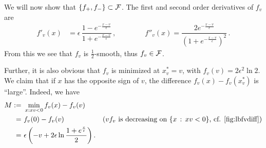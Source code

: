 We will now show that $\{f_+, f_-\}\subset \mathcal{F}$.
The first and second order derivatives of $f_v$ are
\begin{align*}
f'_v(x) &=\epsilon\, \dfrac{1-e^{-\frac{x-v}{\epsilon}}}{1+e^{-\frac{x-v}{\epsilon}}} \,, \qquad \qquad
f''_v(x) = \dfrac{2e^{-\frac{x-v}{\epsilon}} }{\left(  1+e^{-\frac{x-v}{\epsilon}}\right)^2}  \,.
\end{align*}
From this we see that $f_v$ is $\frac{1}{2}$-smooth, thus $f_v\in \mathcal{F}$.

Further, it is also obvious that $f_v$ is minimized at $x^*_v = v$, with $f_v(v) = 2 \epsilon^2 \ln 2$.
We claim that if $x$ has the opposite sign of $v$, the difference $f_v(x)-f_v(x_v^*)$ is ``large''.
Indeed, we have
\begin{align}
M:=&\,\, \min_{x:xv<0} f_v(x) - f_v(v) \nonumber \\
 = & \,\, f_v(0) - f_v(v)  & (v f_v \text{ is decreasing on }\{x\,:\, xv<0\}\text{, cf. \cref{fig:lbfvdiff}}) \nonumber \\
= &\,\, \epsilon\left(-v + 2\epsilon\ln\dfrac{1+e^{\frac{v}{\epsilon}}}{2}\right). \nonumber %
\end{align}

